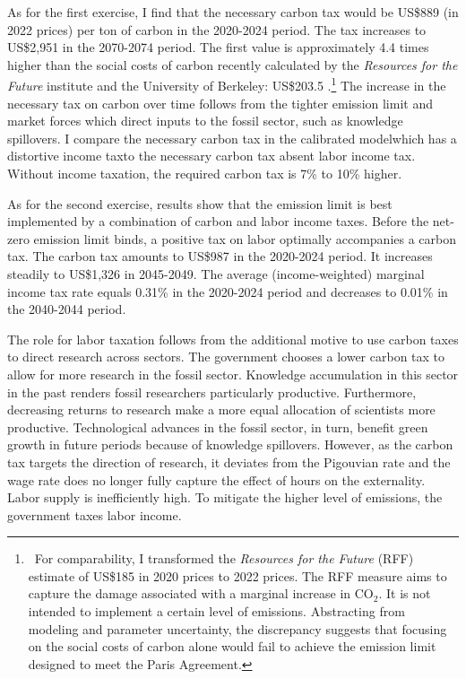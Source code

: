As for the first exercise, I find that the necessary carbon tax would be US\$889 (in 2022 prices) per ton of carbon in the 2020-2024 period. The tax increases to US\$2,951 in the 2070-2074 period. The first value is approximately 4.4 times higher than the social costs of carbon recently calculated by the \textit{Resources for the Future} institute and the University of Berkeley: US\$203.5 \citep{Rennert2022ComprehensiveCO2}.\footnote{\  For comparability, I transformed the \textit{Resources for the Future} (RFF) estimate of US\$185 in 2020 prices to 2022 prices. The RFF measure aims to capture the damage associated with a marginal increase in CO$_2$. It is not intended to implement a certain level of emissions. Abstracting from modeling and parameter uncertainty, the discrepancy suggests that focusing on the social costs of carbon alone would fail to achieve the emission limit designed to meet the Paris Agreement. } 
The increase in the necessary tax on carbon over time follows from the tighter emission limit and market forces which direct inputs to the fossil sector, such as knowledge spillovers. I compare the necessary carbon tax in the calibrated model\textemdash which has a distortive income tax\textemdash to the necessary carbon tax absent labor income tax. Without income taxation, the required carbon tax is  7\% to 10\% higher.

As for the second exercise, results show that the emission limit is best implemented by a combination of carbon and labor income taxes. Before the net-zero emission limit binds, a positive tax on labor optimally accompanies a carbon tax. The carbon tax amounts to US\$987 in the 2020-2024 period. It increases steadily to US\$1,326 in 2045-2049. The average (income-weighted) marginal income tax rate equals 0.31\% in the 2020-2024 period and decreases to 0.01\% in the 2040-2044 period.

The role for labor taxation follows from the additional motive to use carbon taxes to direct research across sectors. The government chooses a lower carbon tax to allow for more research in the fossil sector. Knowledge accumulation in this sector in the past renders fossil researchers particularly productive. Furthermore, decreasing returns to research make a more equal allocation of scientists more productive. Technological advances in the fossil sector, in turn, benefit green growth in future periods because of knowledge spillovers. However, as the carbon tax targets the direction of research, it deviates from the Pigouvian rate and the wage rate does no longer fully capture the effect of hours on the externality. Labor supply is inefficiently high.
To mitigate the higher level of emissions, the government taxes labor income. 


